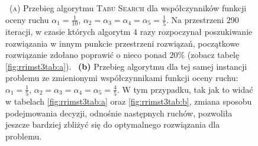 \begin{figure}[!h]
{		~\textsc{(a)} Przebieg algorytmu \textsc{Tabu Search} dla współczynników funkcji oceny ruchu $\alpha_{1} = \frac{1}{10}$, $\alpha_{2} = \alpha_{3} = \alpha_{4} = \alpha_{5} = \frac{1}{5}$. Na przestrzeni $290$ iteracji, w czasie których algorytm $4$ razy rozpoczynał poszukiwanie rozwiązania w innym punkcie przestrzeni rozwiązań, początkowe rozwiązanie zdołano poprawić o nieco ponad $20\%$ (zobacz tabelę \ref{fig:rrimst3tab:a}).
		~\textbf{(b)} Przebieg algorytmu dla tej samej instancji problemu ze zmienionymi współczynnikami funkcji oceny ruchu: $\alpha_{1} = \frac{1}{5}$, $\alpha_{2} = \alpha_{3} = \alpha_{4} = \alpha_{5} = \frac{4}{5}$. W tym przypadku, tak jak to widać w tabelach \ref{fig:rrimst3tab:a} oraz \ref{fig:rrimst3tab:b}, zmiana sposobu podejmowania decyzji, odnośnie następnych ruchów, pozwoliła jeszcze bardziej zbliżyć się do optymalnego rozwiązania dla problemu.
	}
	\label{fig:rrimst3}
\end{figure}

